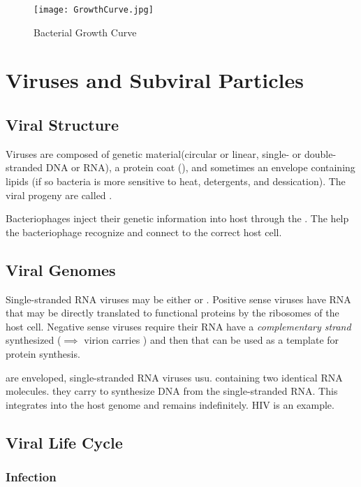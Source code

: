 \documentclass[../Bio_chemistryReview.tex]{subfiles}
\begin{document}
\begin{figure}[h] \centering \texttt{[image: GrowthCurve.jpg]}
  \caption{Bacterial Growth Curve} \end{figure}

\section{Viruses and Subviral Particles\supdag}

\subsection{Viral Structure\supdag}

Viruses are composed of genetic material(circular or linear, single- or
double-stranded DNA or RNA), a protein coat (), and sometimes an
envelope containing lipids (if so bacteria is more sensitive to heat,
detergents, and dessication). The viral progeny are called .\par
Bacteriophages inject their genetic information into host through the
. The 
help the bacteriophage recognize and connect to the correct host cell.

\subsection{Viral Genomes\supdag}

Single-stranded RNA viruses may be either  or
. Positive sense viruses have RNA that may be directly
translated to functional proteins by the ribosomes of the host cell. Negative
sense viruses require their RNA have a \emph{complementary strand} synthesized
($ \implies $ virion carries ) and then that can be used as
a template for protein synthesis.\par {} are enveloped,
single-stranded RNA viruses usu. containing two identical RNA molecules. they
carry  to synthesize DNA from the single-stranded
RNA. This integrates into the host genome and remains indefinitely. HIV is an
example.

\subsection{Viral Life Cycle\supdag}

\subsubsection{Infection\supdag}
\end{document}
